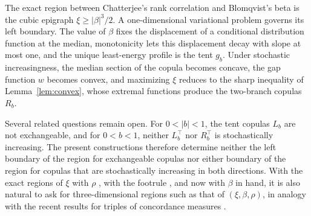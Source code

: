 \documentclass[twocolumn,a4paper]{article}
\makeatletter
\renewcommand\section{\@startsection{section}{1}{\z@}{-3.5ex \@plus -1ex \@minus -.2ex}{2.3ex \@plus.2ex}{\normalfont\Large\bfseries\raggedright}}
\numberwithin{equation}{section}
\theoremstyle{remark}
\newcommand{\1}{\mathbf{1}}
\makeatother
\begin{document}
\section{Concluding remarks}\label{sec:conclusion}

The exact region between Chatterjee's rank correlation and Blomqvist's beta is the cubic epigraph \(\xi\ge|\beta|^3/2\).
A one-dimensional variational problem governs its left boundary.
The value of \(\beta\) fixes the displacement of a conditional distribution function at the median, monotonicity lets this displacement decay with slope at most one, and the unique least-energy profile is the tent \(g_b\).
Under stochastic increasingness, the median section of the copula becomes concave, the gap function \(w\) becomes convex, and maximizing \(\xi\) reduces to the sharp inequality of Lemma~\ref{lem:convex}, whose extremal functions produce the two-branch copulas \(R_b\).

Several related questions remain open.
For \(0<|b|<1\), the tent copulas \(L_b\) are not exchangeable, and for \(0<b<1\), neither \(L_b^\top\) nor \(R_b^\top\) is stochastically increasing.
The present constructions therefore determine neither the left boundary of the region for exchangeable copulas nor either boundary of the region for copulas that are stochastically increasing in both directions.
With the exact regions of \(\xi\) with \(\rho\) \cite{ansari2026exact}, with the footrule \cite{rockel2026exact}, and now with \(\beta\) in hand, it is also natural to ask for three-dimensional regions such as that of \((\xi,\beta,\rho)\), in analogy with the recent results for triples of concordance measures \cite{bukovvsek2025exact,kokolbukovsek2026footrule,orenday2026taufootrulebeta}.



\end{document}
